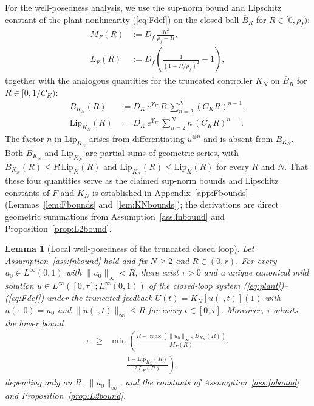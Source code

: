 \documentclass[10pt,a4paper]{amsart}
\newtheorem{lemma}{Lemma}
\newcommand{\Linf}{L^\infty}
\newcommand{\Lipk}{\mathrm{Lip}_K}
\newcommand{\LipKn}{\mathrm{Lip}_{K_N}}
\begin{document}
For the well-posedness analysis, we use the sup-norm bound and Lipschitz constant of the plant nonlinearity (\ref{eq:Fdef}) on the closed ball $\overline B_R$ for $R \in [0, \rho_f)$:
\begin{align}
M_F(R) &:= D_f\,\frac{R^2}{\rho_f - R}, \label{eq:MFdef}\\
L_F(R) &:= D_f\!\left(\frac{1}{(1 - R/\rho_f)^2} - 1\right), \label{eq:LFdef}
\end{align}
together with the analogous quantities for the truncated controller $K_N$ on $\overline B_R$ for $R \in [0, 1/C_K)$:
\begin{align}
B_{K_N}(R) &:= D_K\, e^{\Upsilon_K}\, R\, \sum_{n=2}^N (C_K R)^{n-1}, \label{eq:BKNdef}\\
\LipKn(R) &:= D_K\, e^{\Upsilon_K}\, \sum_{n=2}^N n\,(C_K R)^{n-1}. \label{eq:LipKNdef}
\end{align}
The factor $n$ in $\LipKn$ arises from differentiating $u^{\otimes n}$ and is absent from $B_{K_N}$. Both $B_{K_N}$ and $\LipKn$ are partial sums of geometric series, with $B_{K_N}(R) \le R\, \Lipk(R)$ and $\LipKn(R) \le \Lipk(R)$ for every $R$ and $N$. That these four quantities serve as the claimed sup-norm bounds and Lipschitz constants of $F$ and $K_N$ is established in Appendix~\ref{app:Fbounds} (Lemmas~\ref{lem:Fbounds} and~\ref{lem:KNbounds}); the derivations are direct geometric summations from Assumption~\ref{ass:fnbound} and Proposition~\ref{prop:L2bound}.

\begin{lemma}[Local well-posedness of the truncated closed loop]\label{lem:wellposed}
Let Assumption~\ref{ass:fnbound} hold and fix $N \ge 2$ and $R \in (0, \bar r)$. For every $u_0 \in \Linf(0,1)$ with $\|u_0\|_\infty < R$, there exist $\tau > 0$ and a unique canonical mild solution $u \in \Linf([0, \tau]; \Linf(0,1))$ of the closed-loop system (\ref{eq:plant})--(\ref{eq:Fdef}) under the truncated feedback $U(t) = K_N[u(\cdot, t)](1)$ with $u(\cdot, 0) = u_0$ and $\|u(\cdot, t)\|_\infty \le R$ for every $t \in [0, \tau]$. Moreover, $\tau$ admits the lower bound
\begin{eqnarray}
\tau &\ge& \min\!\left(\frac{R - \max(\|u_0\|_\infty,\, B_{K_N}(R))}{M_F(R)},\right. \nonumber \\
&& \quad\quad \left.\frac{1 - \LipKn(R)}{2\, L_F(R)}\right),
\label{eq:tau_lb}
\end{eqnarray}
depending only on $R$, $\|u_0\|_\infty$, and the constants of Assumption~\ref{ass:fnbound} and Proposition~\ref{prop:L2bound}.
\end{lemma}
\end{document}
